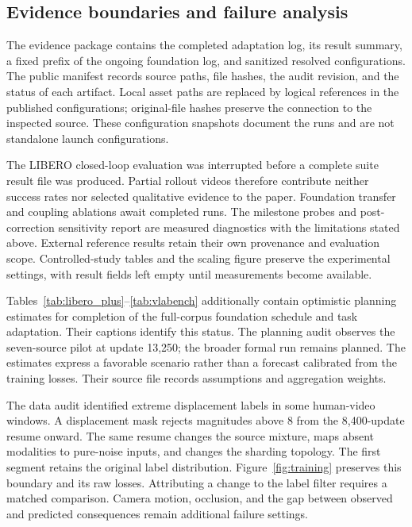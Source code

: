 \FloatBarrier

\subsection{Evidence boundaries and failure analysis}
\label{app:evidence}
The evidence package contains the completed adaptation log, its result summary, a fixed prefix of
the ongoing foundation log, and sanitized resolved configurations. The public manifest records
source paths, file hashes, the audit revision, and the status of each artifact. Local asset paths
are replaced by logical references in the published configurations; original-file hashes preserve
the connection to the inspected source. These configuration snapshots document the runs and are not
standalone launch configurations.

The LIBERO closed-loop evaluation was interrupted before a complete suite result file was produced.
Partial rollout videos therefore contribute neither success rates nor selected qualitative evidence
to the paper. Foundation transfer and coupling ablations await completed runs. The milestone probes and
post-correction sensitivity report are measured diagnostics with the limitations stated above.
External reference results retain their own provenance and evaluation scope. Controlled-study tables
and the scaling figure preserve the experimental settings, with result fields left empty until
measurements become available.

Tables~\ref{tab:libero_plus}--\ref{tab:vlabench} additionally contain optimistic planning estimates
for completion of the full-corpus foundation schedule and task adaptation. Their captions identify
this status. The planning audit observes the seven-source pilot at update 13,250; the broader formal
run remains planned. The estimates express a favorable scenario rather than a forecast calibrated
from the training losses. Their source file records assumptions and aggregation weights.

The data audit identified extreme displacement labels in some human-video windows. A displacement
mask rejects magnitudes above 8 from the 8,400-update resume onward. The same resume changes the
source mixture, maps absent modalities to pure-noise inputs, and changes the sharding topology.
The first segment retains the original label distribution. Figure~\ref{fig:training} preserves this
boundary and its raw losses. Attributing a change to the label filter requires a matched comparison.
Camera motion, occlusion, and the gap between observed and predicted consequences remain additional
failure settings.

